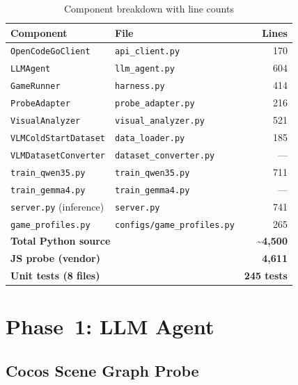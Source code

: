 \documentclass[11pt,a4paper]{article}
\begin{document}
\begin{table}[H]
\centering
\caption{Component breakdown with line counts}
\label{tab:components}
\begin{tabular}{@{}llr@{}}
\toprule
\textbf{Component} & \textbf{File} & \textbf{Lines} \\
\midrule
\texttt{OpenCodeGoClient} & \texttt{api\_client.py} & 170 \\
\texttt{LLMAgent}          & \texttt{llm\_agent.py} & 604 \\
\texttt{GameRunner}        & \texttt{harness.py}    & 414 \\
\texttt{ProbeAdapter}      & \texttt{probe\_adapter.py} & 216 \\
\texttt{VisualAnalyzer}    & \texttt{visual\_analyzer.py} & 521 \\
\texttt{VLMColdStartDataset} & \texttt{data\_loader.py} & 185 \\
\texttt{VLMDatasetConverter} & \texttt{dataset\_converter.py} & — \\
\texttt{train\_qwen35.py}  & \texttt{train\_qwen35.py} & 711 \\
\texttt{train\_gemma4.py}  & \texttt{train\_gemma4.py} & — \\
\texttt{server.py} (inference) & \texttt{server.py} & 741 \\
\texttt{game\_profiles.py} & \texttt{configs/game\_profiles.py} & 265 \\
\midrule
\multicolumn{2}{l}{\textbf{Total Python source}} & \textbf{\textasciitilde 4,500} \\
\multicolumn{2}{l}{\textbf{JS probe (vendor)}} & \textbf{4,611} \\
\multicolumn{2}{l}{\textbf{Unit tests (8 files)}} & \textbf{245 tests} \\
\bottomrule
\end{tabular}
\end{table}

\section{Phase~1: LLM Agent}

\subsection{Cocos Scene Graph Probe}
\end{document}
